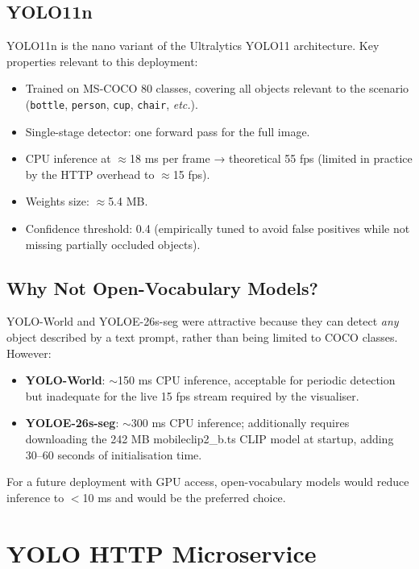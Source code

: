 \subsection{YOLO11n}

YOLO11n is the nano variant of the Ultralytics YOLO11 architecture.
Key properties relevant to this deployment:

\begin{itemize}[noitemsep]
  \item Trained on MS-COCO 80 classes, covering all objects relevant to the scenario
        (\texttt{bottle}, \texttt{person}, \texttt{cup}, \texttt{chair}, \textit{etc.}).
  \item Single-stage detector: one forward pass for the full image.
  \item CPU inference at $\approx$18 ms per frame → theoretical 55 fps
        (limited in practice by the HTTP overhead to $\approx$15 fps).
  \item Weights size: $\approx$5.4 MB.
  \item Confidence threshold: 0.4 (empirically tuned to avoid false positives
        while not missing partially occluded objects).
\end{itemize}

\subsection{Why Not Open-Vocabulary Models?}

YOLO-World and YOLOE-26s-seg were attractive because they can detect \emph{any}
object described by a text prompt, rather than being limited to COCO classes.
However:

\begin{itemize}[noitemsep]
  \item \textbf{YOLO-World}: $\sim$150 ms CPU inference, acceptable for periodic
        detection but inadequate for the live 15 fps stream required by the visualiser.
  \item \textbf{YOLOE-26s-seg}: $\sim$300 ms CPU inference; additionally requires
        downloading the 242 MB mobileclip2\_b.ts CLIP model at startup, adding
        30--60 seconds of initialisation time.
\end{itemize}

For a future deployment with GPU access, open-vocabulary models would reduce inference
to $<$10 ms and would be the preferred choice.

\section{YOLO HTTP Microservice}

